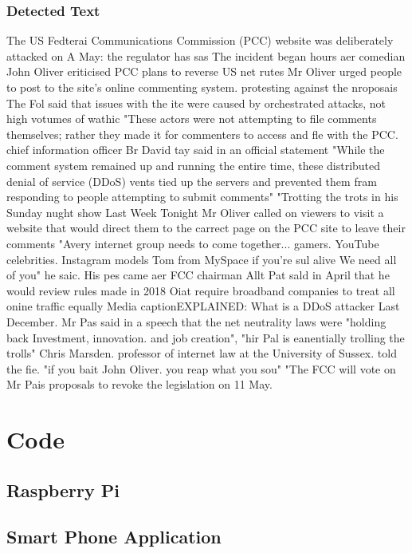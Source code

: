 \subsubsection{Detected Text}
The US Fedterai Communications Commission (PCC) website was deliberately attacked on A
May: the regulator has sas
The incident began hours aer comedian John Oliver eriticised PCC plans to reverse US net
rutes
Mr Oliver urged people to post to the site's online commenting system. protesting against
the nroposais
The Fol said that issues with the ite were caused by orchestrated attacks, not high
votumes of wathic
"These actors were not attempting to file comments themselves; rather they made it
for commenters to access and fle with the PCC. chief information officer
Br David tay said in an official statement
"While the comment system remained up and running the entire time, these distributed
denial of service (DDoS)  vents tied up the servers and prevented them fram responding to
people attempting to submit comments"
"Trotting the trots
in his Sunday nught show Last Week Tonight Mr Oliver called on viewers to visit a website
that would direct them to the carrect page on the PCC site to leave their comments
"Avery internet group needs to come together... gamers. YouTube celebrities. Instagram
models Tom from MySpace if you're sul alive We need all of you" he saic.
His pes came aer FCC chairman Allt Pat sald in April that he would review rules made in
2018 Oiat require broadband companies to treat all onine traffic equally
Media captionEXPLAINED: What is a DDoS attacker
Last December. Mr Pas said in a speech that the net neutrality laws were "holding back
Investment, innovation. and job creation",
"hir Pal is eanentially trolling the trolls" Chris Marsden. professor of internet law at the
University of Sussex. told the fie.
"if you bait John Oliver. you reap what you sou"
"The FCC will vote on Mr Pais proposals to revoke the legislation on 11 May.

\pagebreak

\section{Code}
\subsection{Raspberry Pi}


\subsection{Smart Phone Application}

